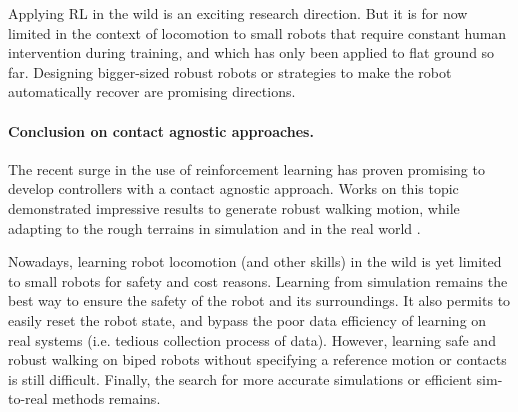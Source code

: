 Applying RL in the wild is an exciting research direction. But it is for now limited in the context of locomotion to small robots that require constant human intervention during training, and which has only been applied to flat ground so far.
Designing bigger-sized robust robots or strategies to make the robot automatically recover \cite{leo_robot_2010} are promising directions.

\paragraph{Conclusion on contact agnostic approaches.}
The recent surge in the use of reinforcement learning has proven promising to develop controllers with a contact agnostic approach.
Works on this topic demonstrated impressive results to generate robust walking motion, while adapting to the rough terrains in simulation \cite{VAE_jungdam_2022} and in the real world \cite{yang2022safe}.

Nowadays, learning robot locomotion (and other skills) in the wild is yet limited to small robots for safety and cost reasons.
Learning from simulation remains the best way to ensure the safety of the robot and its surroundings.
It also permits to easily reset the robot state, and bypass the poor data efficiency of learning on real systems \cite{atrias_rl_sim_to_real} (i.e. tedious collection process of data). 
However, learning safe and robust walking on biped robots without specifying a reference motion or contacts is still difficult.
Finally, the search for more accurate simulations or efficient sim-to-real methods remains.



